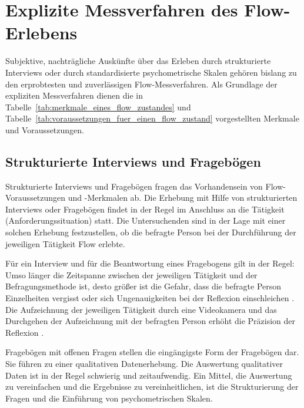 

\section{Explizite Messverfahren des Flow-Erlebens} 

\label{sec:explizite_messverfahren_des_flow_erlebens}

Subjektive, nachträgliche Auskünfte über das Erleben durch strukturierte Interviews oder durch standardisierte psychometrische Skalen gehören bislang zu den erprobtesten und zuverlässigen Flow-Messverfahren. Als Grundlage der expliziten Messverfahren dienen die in Tabelle~\ref{tab:merkmale_eines_flow_zustandes} und Tabelle~\ref{tab:voraussetzungen_fuer_einen_flow_zustand} vorgestellten Merkmale und Voraussetzungen.

\subsection{Strukturierte Interviews und Fragebögen} 

\label{sub:strukturierte_interviews_und_fragebogen}

Strukturierte Interviews und Fragebögen fragen das Vorhandensein von Flow-Voraussetzungen und -Merkmalen ab. Die Erhebung mit Hilfe von strukturierten Interviews oder Fragebögen findet in der Regel im Anschluss an die Tätigkeit (Anforderungssituation) statt. Die Untersuchenden sind in der Lage mit einer solchen Erhebung festzustellen, ob die befragte Person bei der Durchführung der jeweiligen Tätigkeit Flow erlebte.

Für ein Interview und für die Beantwortung eines Fragebogens gilt in der Regel: Umso länger die Zeitspanne zwischen der jeweiligen Tätigkeit und der Befragungsmethode ist, desto größer ist die Gefahr, dass die befragte Person Einzelheiten vergisst oder sich Ungenauigkeiten bei der Reflexion einschleichen \citep[][S.~87]{Henk2014}. Die Aufzeichnung der jeweiligen Tätigkeit durch eine Videokamera und das Durchgehen der Aufzeichnung mit der befragten Person erhöht die Präzision der Reflexion \citep[Video-Recall, ][S.~566]{Leuchter2006}.

Fragebögen mit offenen Fragen stellen die eingängigste Form der Fragebögen dar. Sie führen zu einer qualitativen Datenerhebung. Die Auswertung qualitativer Daten ist in der Regel schwierig und zeitaufwendig. Ein Mittel, die Auswertung zu vereinfachen und die Ergebnisse zu vereinheitlichen, ist die Strukturierung der Fragen und die Einführung von psychometrischen Skalen.

